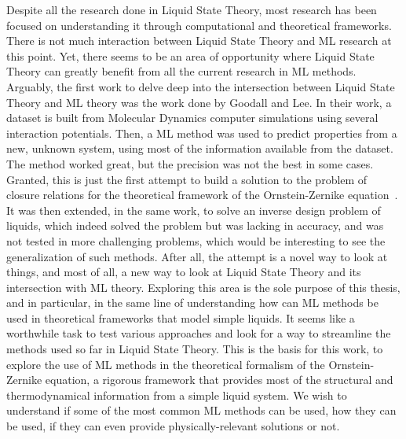 Despite all the research done in Liquid State Theory, most research has been focused on
understanding it through computational and theoretical frameworks. There is not much
interaction between Liquid State Theory and ML research at this point.
Yet, there seems to be an area of opportunity where Liquid State Theory can greatly
benefit from all the current research in ML methods. Arguably, the first work to delve deep 
into the intersection between Liquid State Theory and ML theory was the work done by
Goodall and Lee.
In their work, a dataset is built from Molecular Dynamics computer simulations using several
interaction potentials. Then, a ML method was used to predict properties from a new,
unknown system, using most of the information available from the dataset.
The method worked great, but the precision was not the best in some cases. Granted, this
is just the first attempt to build a solution to the problem of closure relations
for the theoretical framework of the Ornstein-Zernike equation~\cite{hansenTheorySimpleLiquids2013}.
It was then extended, in the same work, to solve an inverse design problem of liquids, 
which indeed solved the problem but was lacking in accuracy, and was not tested in
more challenging problems, which would be interesting to see the generalization of
such methods.
After all, the attempt is a novel way to look at things, and most of all, a new way to
look at Liquid State Theory and its intersection with ML theory.
Exploring this area is the sole purpose of this thesis, and in particular, in the same
line of understanding how can ML methods be used in theoretical frameworks that model
simple liquids. It seems like a worthwhile task to test various approaches and look for a
way to streamline the methods used so far in Liquid State Theory. This is the basis for
this work, to explore the use of ML methods in the theoretical formalism of the
Ornstein-Zernike equation, a rigorous framework that provides most of the structural and thermodynamical information from
a simple liquid system. We wish to understand if some of the most common ML methods
can be used, how they can be used, if they can even provide physically-relevant
solutions or not.

